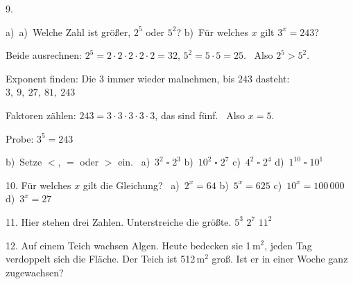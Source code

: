 \documentclass[11pt]{article}
\newcommand{\grau}[1]{{\color{mbgrau}#1}}
\begin{document}
\begin{pfaufg}{}{9.}{}
\grau{a)\ a)~Welche Zahl ist größer, $2^5$ oder $5^2$? \qquad b)~Für welches $x$ gilt $3^x = 243$?\par\smallskip Beide ausrechnen: \quad $2^5 = 2 \cdot 2 \cdot 2 \cdot 2 \cdot 2 = 32$, \quad $5^2 = 5 \cdot 5 = 25$. \ Also $2^5 > 5^2$.\par Exponent finden: Die $3$ immer wieder malnehmen, bis $243$ dasteht: \quad $3,\ 9,\ 27,\ 81,\ 243$\par Faktoren zählen: $243 = 3 \cdot 3 \cdot 3 \cdot 3 \cdot 3$, das sind fünf. \ Also $x = 5$.\par Probe: \quad $3^5 = 243$ \checkmark}
\par\medskip
b)\ Setze $<$, $=$ oder $>$ ein. \ a)~$3^2 \;\square\; 2^3$ \qquad b)~$10^2 \;\square\; 2^7$ \qquad c)~$4^2 \;\square\; 2^4$ \qquad d)~$1^{10} \;\square\; 10^1$
\end{pfaufg}

\begin{pfaufg}{}{10.}{}
Für welches $x$ gilt die Gleichung? \ a)~$2^x = 64$ \qquad b)~$5^x = 625$ \qquad c)~$10^x = 100\,000$ \qquad d)~$3^x = 27$
\end{pfaufg}

\begin{pfaufg}{}{11.}{}
Hier stehen drei Zahlen. Unterstreiche die größte. \quad $5^3$ \qquad $2^7$ \qquad $11^2$
\end{pfaufg}

\begin{pfaufg}{}{12.}{}
Auf einem Teich wachsen Algen. Heute bedecken sie 1\,m$^2$, jeden Tag verdoppelt sich die Fläche. Der Teich ist 512\,m$^2$ groß. Ist er in einer Woche ganz zugewachsen?
\end{pfaufg}
\end{document}
